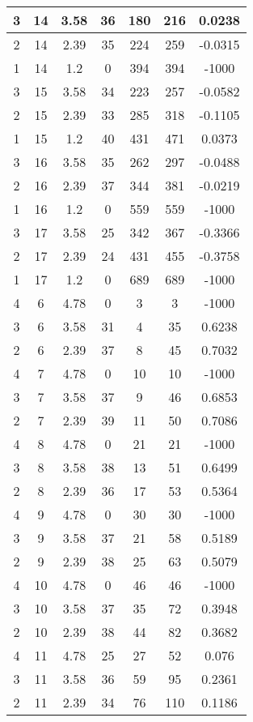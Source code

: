 \documentclass[letterpaper, 12pt]{article}
\begin{document}
\begin{longtable}{|c|c|c|c|c|c|c|}
\hline
3 & 14 & 3.58 & 36 & 180 & 216 & 0.0238 \\
\hline
2 & 14 & 2.39 & 35 & 224 & 259 & -0.0315 \\
\hline
1 & 14 & 1.2 & 0 & 394 & 394 & -1000 \\
\hline
3 & 15 & 3.58 & 34 & 223 & 257 & -0.0582 \\
\hline
2 & 15 & 2.39 & 33 & 285 & 318 & -0.1105 \\
\hline
1 & 15 & 1.2 & 40 & 431 & 471 & 0.0373 \\
\hline
3 & 16 & 3.58 & 35 & 262 & 297 & -0.0488 \\
\hline
2 & 16 & 2.39 & 37 & 344 & 381 & -0.0219 \\
\hline
1 & 16 & 1.2 & 0 & 559 & 559 & -1000 \\
\hline
3 & 17 & 3.58 & 25 & 342 & 367 & -0.3366 \\
\hline
2 & 17 & 2.39 & 24 & 431 & 455 & -0.3758 \\
\hline
1 & 17 & 1.2 & 0 & 689 & 689 & -1000 \\
\hline
4 & 6 & 4.78 & 0 & 3 & 3 & -1000 \\
\hline
3 & 6 & 3.58 & 31 & 4 & 35 & 0.6238 \\
\hline
2 & 6 & 2.39 & 37 & 8 & 45 & 0.7032 \\
\hline
4 & 7 & 4.78 & 0 & 10 & 10 & -1000 \\
\hline
3 & 7 & 3.58 & 37 & 9 & 46 & 0.6853 \\
\hline
2 & 7 & 2.39 & 39 & 11 & 50 & 0.7086 \\
\hline
4 & 8 & 4.78 & 0 & 21 & 21 & -1000 \\
\hline
3 & 8 & 3.58 & 38 & 13 & 51 & 0.6499 \\
\hline
2 & 8 & 2.39 & 36 & 17 & 53 & 0.5364 \\
\hline
4 & 9 & 4.78 & 0 & 30 & 30 & -1000 \\
\hline
3 & 9 & 3.58 & 37 & 21 & 58 & 0.5189 \\
\hline
2 & 9 & 2.39 & 38 & 25 & 63 & 0.5079 \\
\hline
4 & 10 & 4.78 & 0 & 46 & 46 & -1000 \\
\hline
3 & 10 & 3.58 & 37 & 35 & 72 & 0.3948 \\
\hline
2 & 10 & 2.39 & 38 & 44 & 82 & 0.3682 \\
\hline
4 & 11 & 4.78 & 25 & 27 & 52 & 0.076 \\
\hline
3 & 11 & 3.58 & 36 & 59 & 95 & 0.2361 \\
\hline
2 & 11 & 2.39 & 34 & 76 & 110 & 0.1186 \\

\end{longtable}
\end{document}
